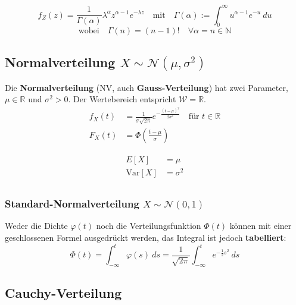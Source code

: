 \documentclass[11pt]{article}
\newcommand{\Var}{\text{Var}}
\begin{document}
\begin{equation*}
	f_Z(z) = \frac{1}{\Gamma (\alpha)}\lambda^\alpha z^{\alpha-1} e^{-\lambda z} \quad\text{mit}\quad \Gamma(\alpha) := \int_0^\infty u^{\alpha-1}e^{-u}\ du
\end{equation*}
\begin{equation*}
	\text{wobei}\quad \Gamma(n) = (n-1)! \quad \forall \alpha = n \in \mathbb{N}
\end{equation*}

\subsection{Normalverteilung $X \sim \mathcal{N}(\mu, \sigma^2)$}

Die \textbf{Normalverteilung} (NV, auch \textbf{Gauss-Verteilung}) hat zwei Parameter, $\mu \in \mathbb{R}$ und $\sigma^2 > 0$. Der Wertebereich entspricht $\mathcal{W} = \mathbb{R}$.
\begin{equation*}
\begin{split}
	f_X(t) & = \frac{1}{\sigma\sqrt{2\pi}}e^{-\frac{(t-\mu)^2}{2\sigma^2}}\quad\text{f{\"u}r } t \in \mathbb{R} \\
	F_X(t) & = \Phi(\frac{t-\mu}{\sigma})
\end{split}
\end{equation*}

\begin{equation*}
\begin{split}
	E[X] & = \mu \\
	\Var[X] & = \sigma^2 \\
\end{split}
\end{equation*}

\subsubsection{Standard-Normalverteilung $X \sim \mathcal{N}(0, 1)$}

Weder die Dichte $\varphi(t)$ noch die Verteilungsfunktion $\Phi(t)$ k{\"o}nnen mit einer geschlossenen Formel ausgedr{\"u}ckt werden, das Integral ist jedoch \textbf{tabelliert}:
\begin{equation*}
	\Phi(t) = \int_{-\infty}^t \varphi(s)\ ds = \frac{1}{\sqrt{2\pi}}\int_{-\infty}^t e^{-\frac{1}{2}s^2}\ ds
\end{equation*}

\subsection{Cauchy-Verteilung}
\end{document}
